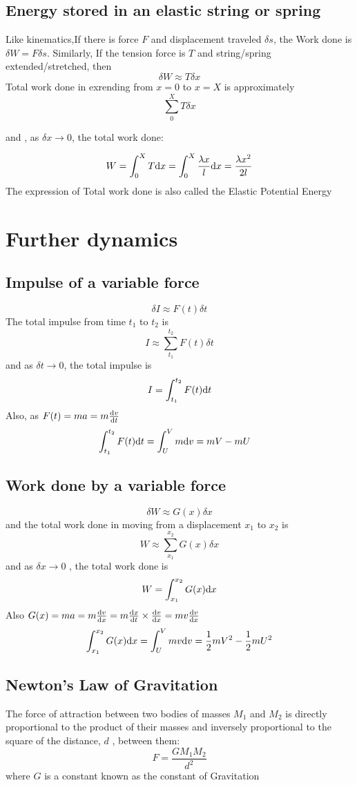 \documentclass[a4paper]{article}
\begin{document}
\subsection{Energy stored in an elastic string or spring}
Like kinematics,If there is force $F$ and displacement traveled $\delta s$, the Work done is $\delta W=F\delta s$. Similarly, If the tension force is $T$ and string/spring extended/stretched, then
\[
	\delta W \approx T \delta x
\]
Total work done in exrending from $x=0$ to $x=X$ is approximately
\[
	\sum^{X}_0 T \delta x
\]

and , as $\delta x \rightarrow 0 $, the total work done:

\[
	W=\int^X_0 T \mathrm{d} x= \int^X_0 \frac{\lambda x}{l}\mathrm{d} x=\frac{\lambda x^2}{2l}
\]
The expression of Total work done is also called the Elastic Potential Energy

\section{Further dynamics}
\subsection{Impulse of a variable force}
\[
	\delta I \approx F(t) \delta t
\]
The total impulse from time $t_1$ to $t_2$ is 
\[
    I \approx \sum_{t_1}^{t_2} F(t) \delta t
\]
and as $\delta t \rightarrow 0$, the total impulse is 
\[
    I=\int^{t_2}_{t_1} F(t) \mathrm{d} t
\]
Also, as $F(t)=ma=m\frac{\mathrm{d} v}{\mathrm{d} t}$
\begin{align*}
    \int_{t_1}^{t_2} F(t) \mathrm{d} t &=\int^{V}_{U} m \mathrm{d} v =mV-mU
\end{align*}
\subsection{Work done by a variable force}
\[
    \delta W \approx G(x)\delta x
\]
and the total work done in moving from a displacement $x_1$ to $x_2$ is
\[
    W\approx\sum_{x_1}^{x_2} G(x)\delta x
    \]
and as $\delta x \rightarrow 0$ , the total work done is
\[
    W=\int_{x_1}^{x_2} G(x) \mathrm{d} x
\]
Also $G(x)=ma=m\frac{\mathrm{d} v}{\mathrm{d} x}=m\frac{\mathrm{d} x}{\mathrm{d} t}\times \frac{\mathrm{d} v}{\mathrm{d} x}=mv\frac{\mathrm{d} v}{\mathrm{d} x}$
\[
    \int_{x_1}^{x_2} G(x) \mathrm{d} x =\int_U^V mv \mathrm{d} v =\frac{1}{2}mV^2-\frac{1}{2}mU^2
\]

\subsection{Newton's Law of Gravitation}
\begin{law}
    The force of attraction between two bodies of masses  
$M_1$
  and  
$M_2$
  is directly proportional to the product of their masses and inversely proportional to the square of the distance, 
$d$ , between them:
\[
    F=\frac{GM_1M_2}{d^2}
    \]
where $G$ is a constant known as the constant of Gravitation
\end{law}
\end{document}
